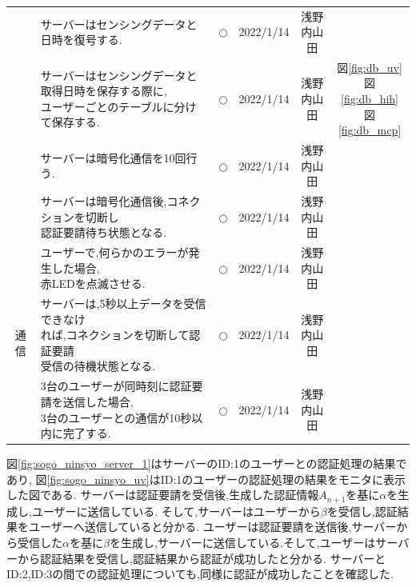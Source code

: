 \begin{table}[htbp]
{\begin{tabular}{|c|l|c|c|c|c|}
 & サーバーはセンシングデータと日時を復号する. &
   $\bigcirc$ & 2022/1/14 &
   \shortstack[l]{
   浅野\\
   内山田}&\\ \cline{2-6}
 & \shortstack[l]{
   サーバーはセンシングデータと取得日時を保存する際に,\\
   ユーザーごとのテーブルに分けて保存する.}  &
   $\bigcirc$ & 2022/1/14 &
   \shortstack[l]{
   浅野\\
   内山田}
 & \shortstack[l]{
図\ref{fig:db_uv}\\
図\ref{fig:db_hih}\\
図\ref{fig:db_mcp}}\\ \cline{2-6}
 & サーバーは暗号化通信を10回行う. &
   $\bigcirc$ & 2022/1/14 &
   \shortstack[l]{
   浅野\\
   内山田}&\\ \cline{2-6}
 &  \shortstack[l]{
   サーバーは暗号化通信後,コネクションを切断し\\
   認証要請待ち状態となる.} &
   $\bigcirc$ & 2022/1/14 &
   \shortstack[l]{
   浅野\\
   内山田}&\\ \hline
 \multirow{3}{*}{通信}
 & \shortstack[l]{
   ユーザーで,何らかのエラーが発生した場合,\\
   赤LEDを点滅させる.} &
   $\bigcirc$ & 2022/1/14 &
   \shortstack[l]{
   浅野\\
   内山田}&\\ \cline{2-6}
 & \shortstack[l]{
   サーバーは,5秒以上データを受信できなけ\\
   れば,コネクションを切断して認証要請\\
   受信の待機状態となる.} &
   $\bigcirc$ & 2022/1/14 &
   \shortstack[l]{
   浅野\\
   内山田}&\\ \cline{2-6}
& \shortstack[l]{
   3台のユーザーが同時刻に認証要請を送信した場合,\\
   3台のユーザーとの通信が10秒以内に完了する.}&
   $\bigcirc$ & 2022/1/14 &
   \shortstack[l]{
   浅野\\
   内山田}&\\ \hline
\end{tabular}
}
\end{table}
図\ref{fig:sogo_ninsyo_server_1}はサーバーのID:1のユーザーとの認証処理の結果であり,
図\ref{fig:sogo_ninsyo_uv}はID:1のユーザーの認証処理の結果をモニタに表示した図である.
サーバーは認証要請を受信後,生成した認証情報$A_{n+1}$を基に$\alpha$を生成し,ユーザーに送信している.
そして,サーバーはユーザーから$\beta$を受信し,認証結果をユーザーへ送信していると分かる.
ユーザーは認証要請を送信後,サーバーから受信した$\alpha$を基に$\beta$を生成し,サーバーに送信している.そして,ユーザーはサーバーから認証結果を受信し,認証結果から認証が成功したと分かる.
サーバーとID:2,ID:3の間での認証処理についても,同様に認証が成功したことを確認した.

